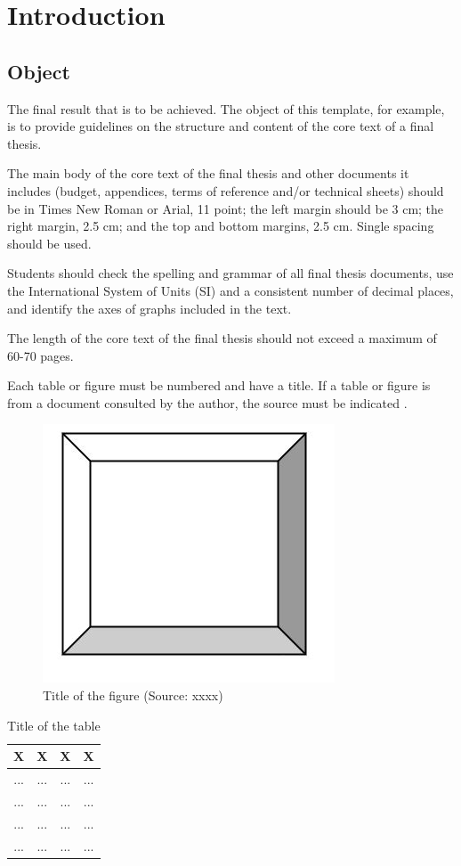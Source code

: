 \chapter{Introduction}

\section{Object}


The final result that is to be achieved. The object of this template, for example, is to provide guidelines on the structure and content of the core text of a final thesis. 

The main body of the core text of the final thesis and other documents it includes (budget, appendices, terms of reference and/or technical sheets) should be in Times New Roman or Arial, 11 point; the left margin should be 3 cm; the right margin, 2.5 cm; and the top and bottom margins, 2.5 cm. Single spacing should be used.

Students should check the spelling and grammar of all final thesis documents, use the International System of Units (SI) and a consistent number of decimal places, and identify the axes of graphs included in the text.

The length of the core text of the final thesis should not exceed a maximum of 60-70 pages.  

Each table or figure must be numbered and have a title. If a table or figure is from a document consulted by the author, the source must be indicated \cite{eseiaat}.  


\begin{figure}[H]
    \centering
    \includegraphics[width=0.3
\linewidth]{Figures/IMATGE_EXEMPLE.jpg}
    \caption{Title of the figure (Source: xxxx)}
    \label{fig:Imatge_exemple}
\end{figure}


\begin{table}[H]

  \centering
   \caption{Title of the table} 
   
  \begin{tabular}{|c|c|c|c|}
    \hline
    \textbf{X} & \textbf{X} & \textbf{X} & \textbf{X} \\
    \hline
    ... & ... & ... & ...\\ \hline
    ... & ... & ... & ...\\ \hline
    ... & ... & ... & ...\\ \hline
    ... & ... & ... & ...\\ \hline
    
  \end{tabular}
  \label{taula_exemple}
 
\end{table}

